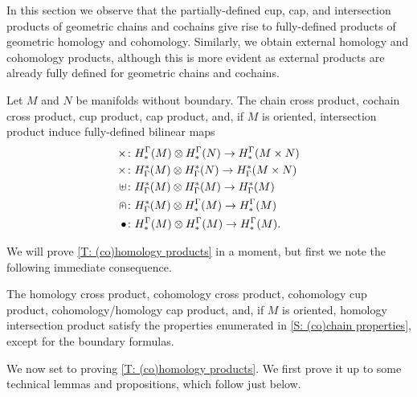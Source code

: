 In this section we observe that the partially-defined cup, cap, and intersection products of geometric chains and cochains give rise to fully-defined products of geometric homology and cohomology.
Similarly, we obtain external homology and cohomology products, although this is more evident as external products are already fully defined for geometric chains and cochains.

\begin{theorem}\label{T: (co)homology products}
	Let $M$ and $N$ be manifolds without boundary.
	The chain cross product, cochain cross product, cup product, cap product, and, if $M$ is oriented, intersection product induce fully-defined bilinear maps
	\begin{align*}
		\times \colon & H^\Gamma_*(M) \otimes H^\Gamma_*(N) \to H^\Gamma_*(M \times N)\\
		\times \colon & H_\Gamma^*(M) \otimes H_\Gamma^*(N) \to H_\Gamma^*(M \times N)\\
		\uplus \colon & H_\Gamma^*(M) \otimes H_\Gamma^*(M) \to H_\Gamma^*(M)\\
		\nplus \colon & H_\Gamma^*(M) \otimes H^\Gamma_*(M) \to H^\Gamma_*(M)\\
		\bullet \colon & H^\Gamma_*(M) \otimes H^\Gamma_*(M) \to H^\Gamma_*(M).\\
	\end{align*}
\end{theorem}

We will prove \cref{T: (co)homology products} in a moment, but first we note the following immediate consequence.

\begin{theorem}
	The homology cross product, cohomology cross product, cohomology cup product, cohomology/homology cap product, and, if $M$ is oriented, homology intersection product satisfy the properties enumerated in \cref{S: (co)chain properties}, except for the boundary formulas.
\end{theorem}

We now set to proving \cref{T: (co)homology products}.
We first prove it up to some technical lemmas and propositions, which follow just below.

